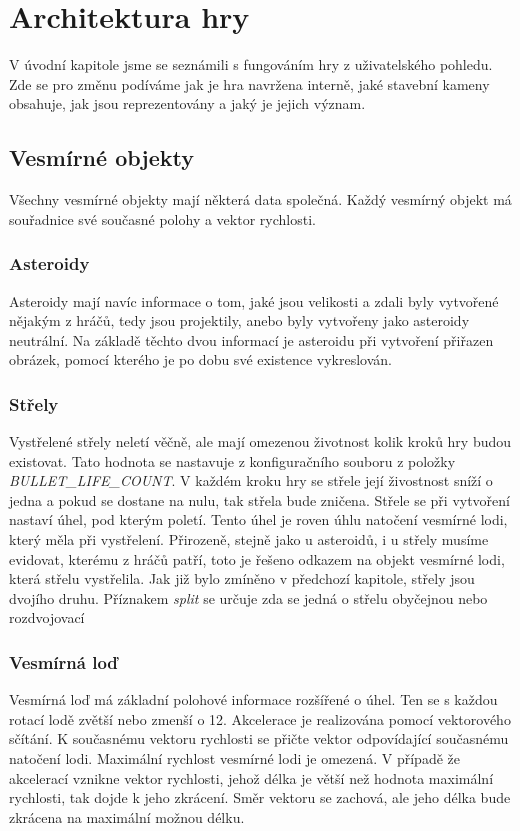 \chapter{Architektura hry}
V úvodní kapitole jsme se seznámili s fungováním hry z uživatelského pohledu. 
Zde se pro změnu podíváme jak je hra navržena interně, jaké stavební kameny obsahuje, jak jsou reprezentovány a jaký je jejich význam.

\section{Vesmírné objekty}
Všechny vesmírné objekty mají některá data společná. Každý vesmírný objekt má souřadnice své současné polohy a vektor rychlosti.

\subsection{Asteroidy}
Asteroidy mají navíc informace o tom, jaké jsou velikosti a zdali byly vytvořené nějakým z hráčů, tedy jsou projektily, anebo byly vytvořeny jako asteroidy neutrální.
Na základě těchto dvou informací je asteroidu při vytvoření přiřazen obrázek, pomocí kterého je po dobu své existence vykreslován.

\subsection{Střely}
Vystřelené střely neletí věčně, ale mají omezenou životnost kolik kroků hry budou existovat.
Tato hodnota se nastavuje z konfiguračního souboru z položky \emph{\uppercase{bullet\_life\_count}}.
V každém kroku hry se střele její živostnost sníží o jedna a pokud se dostane na nulu, tak střela bude zničena.
Střele se při vytvoření nastaví úhel, pod kterým poletí. Tento úhel je roven úhlu natočení vesmírné lodi, který měla při vystřelení.
Přirozeně, stejně jako u asteroidů, i u střely musíme evidovat, kterému z hráčů patří, toto je řešeno odkazem na objekt vesmírné lodi, která střelu vystřelila.
Jak již bylo zmíněno v předchozí kapitole, střely jsou dvojího druhu. Příznakem \emph{split} se určuje zda se jedná o střelu obyčejnou nebo rozdvojovací


\subsection{Vesmírná loď}
Vesmírná loď má základní polohové informace rozšířené o úhel. Ten se s každou rotací lodě zvětší nebo zmenší o 12\textdegree.
Akcelerace je realizována pomocí vektorového sčítání. K současnému vektoru rychlosti se přičte vektor odpovídající současnému natočení lodi.
Maximální rychlost vesmírné lodi je omezená.
V případě že akcelerací vznikne vektor rychlosti, jehož délka je větší než hodnota maximální rychlosti, tak dojde k jeho zkrácení.
Směr vektoru se zachová, ale jeho délka bude zkrácena na maximální možnou délku.


